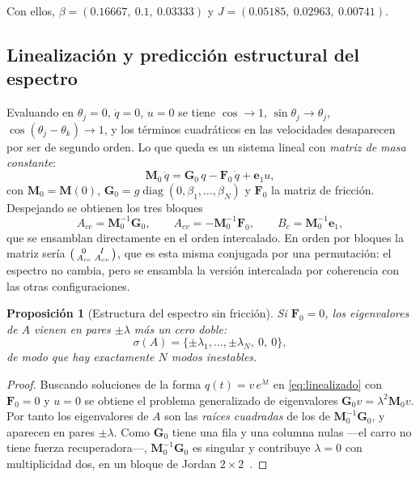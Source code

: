 \documentclass[11pt,letterpaper]{article}
\theoremstyle{definition}
\theoremstyle{plain}
\newtheorem{proposicion}[definicion]{Proposición}
\theoremstyle{remark}
\DeclareMathOperator{\diag}{diag}
\newcommand{\spec}{\sigma}
\newcommand{\Mm}{\bm{M}}
\newcommand{\Gm}{\bm{G}}
\newcommand{\Fm}{\bm{F}}
\begin{document}
Con ellos, $\beta=(0.16667,\ 0.1,\ 0.03333)$ y
$J=(0.05185,\ 0.02963,\ 0.00741)$.

\subsection{Linealización y predicción estructural del espectro}
\label{sec:linealizacion}

Evaluando en $\theta_j=0$, $\dot q=0$, $u=0$ se tiene $\cos\to1$,
$\sin\theta_j\to\theta_j$, $\cos(\theta_j-\theta_k)\to1$, y los términos
cuadráticos en las velocidades desaparecen por ser de segundo orden. Lo que
queda es un sistema lineal con \emph{matriz de masa constante}:
\begin{equation}
\Mm_0\,\ddot q=\Gm_0\,q-\Fm_0\,\dot q+\bm{e}_1u,
\label{eq:linealizado}
\end{equation}
con $\Mm_0=\Mm(0)$, $\Gm_0=g\diag(0,\beta_1,\dots,\beta_N)$ y $\Fm_0$ la matriz
de fricción. Despejando se obtienen los tres bloques
\[
A_{cc}=\Mm_0^{-1}\Gm_0,\qquad A_{cv}=-\Mm_0^{-1}\Fm_0,\qquad
B_c=\Mm_0^{-1}\bm{e}_1,
\]
que se ensamblan directamente en el orden intercalado. En orden por bloques la
matriz sería $\begin{psmallmatrix}0&I\\A_{cc}&A_{cv}\end{psmallmatrix}$, que es
esta misma conjugada por una permutación: el espectro no cambia, pero se
ensambla la versión intercalada por coherencia con las otras configuraciones.

\begin{proposicion}[Estructura del espectro sin fricción]
\label{prop:espectro}
Si $\Fm_0=0$, los eigenvalores de $A$ vienen en pares $\pm\lambda$ más un cero
doble:
\[
\spec(A)=\{\pm\lambda_1,\dots,\pm\lambda_N,\ 0,\ 0\},
\]
de modo que hay exactamente $N$ modos inestables.
\end{proposicion}

\begin{proof}
Buscando soluciones de la forma $q(t)=v\,e^{\lambda t}$ en
\cref{eq:linealizado} con $\Fm_0=0$ y $u=0$ se obtiene el problema generalizado
de eigenvalores $\Gm_0 v=\lambda^2\Mm_0 v$. Por tanto los eigenvalores de $A$
son las \emph{raíces cuadradas} de los de $\Mm_0^{-1}\Gm_0$, y aparecen en pares
$\pm\lambda$. Como $\Gm_0$ tiene una fila y una columna nulas ---el carro no
tiene fuerza recuperadora---, $\Mm_0^{-1}\Gm_0$ es singular y contribuye
$\lambda=0$ con multiplicidad dos, en un bloque de Jordan
$2\times2$~\cite{hoffman1971,olver2018}.
\end{proof}
\end{document}
